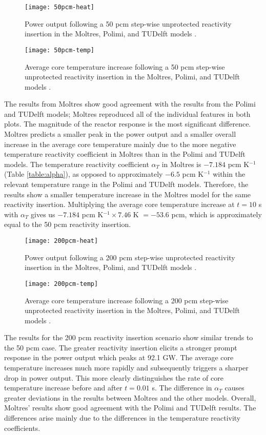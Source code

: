 \begin{figure}[htbp!]
    \centering
    \texttt{[image: 50pcm-heat]}
    \caption{Power output following a 50 pcm step-wise unprotected reactivity
    insertion in the Moltres, Polimi, and
    TUDelft models \cite{fiorina_modelling_2014}.}
    \label{fig:50pcmheat}
%
    \centering
    \texttt{[image: 50pcm-temp]}
    \caption{Average core temperature increase following a 50 pcm step-wise
    unprotected reactivity insertion in the Moltres, Polimi, and
    TUDelft models \cite{fiorina_modelling_2014}.}
    \label{fig:50pcmtemp}
\end{figure}

The results from Moltres show good agreement with the results from the Polimi
and TUDelft models; Moltres reproduced all of the individual features in both
plots. The magnitude of the reactor response is the most significant
difference. Moltres predicts a smaller peak in the power output and a smaller
overall increase in the average core temperature mainly due to the
more negative temperature reactivity coefficient in Moltres than in the Polimi
and TUDelft models. The temperature reactivity coefficient $\alpha_T$ in
Moltres is $-7.184$ pcm K$^{-1}$ (Table \ref{table:alpha}), as opposed to
approximately $-6.5$ pcm K$^{-1}$ within the relevant temperature range in the
Polimi and TUDelft models. Therefore, the results show a smaller temperature
increase in the Moltres model for the same reactivity insertion. Multiplying
the average
core temperature increase at $t=10$ s with $\alpha_T$ gives us $-7.184$ pcm
K$^{-1} \times 7.46$ K $= -53.6$ pcm, which is approximately equal to the 50
pcm reactivity insertion.

\begin{figure}[htbp!]
    \centering
    \texttt{[image: 200pcm-heat]}
    \caption{Power output following a 200 pcm step-wise unprotected reactivity
    insertion in the Moltres, Polimi, and
    TUDelft models \cite{fiorina_modelling_2014}.}
    \label{fig:200pcmheat}
%
    \centering
    \texttt{[image: 200pcm-temp]}
    \caption{Average core temperature increase following a 200 pcm step-wise
    unprotected reactivity insertion in the Moltres, Polimi, and
    TUDelft models \cite{fiorina_modelling_2014}.}
    \label{fig:200pcmtemp}
\end{figure}

The results for the 200 pcm reactivity insertion scenario show similar trends
to the 50 pcm case. The greater reactivity insertion elicits a stronger
prompt response in the power output which peaks at 92.1 GW. The average core
temperature increases much more rapidly and subsequently triggers a sharper
drop in power output. This more clearly distinguishes the rate of
core temperature increase before and after $t=0.01$ s. The difference in
$\alpha_T$ causes greater deviations in the results between Moltres and the
other models. Overall,
Moltres' results show good agreement with the Polimi and TUDelft results.
The differences arise mainly due to the differences in the temperature
reactivity coefficients.


